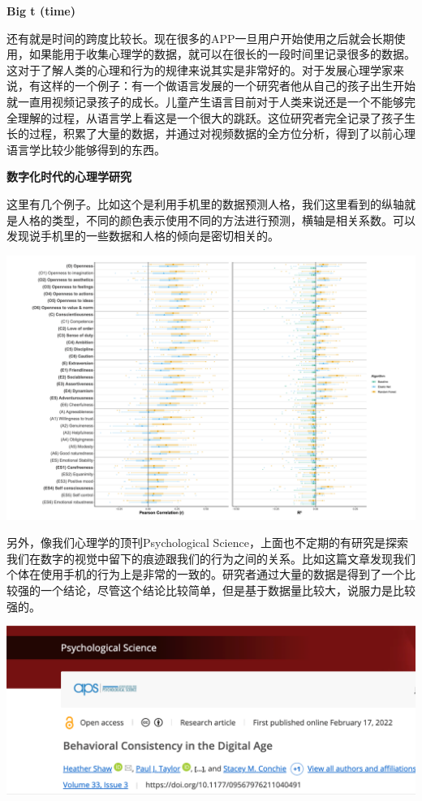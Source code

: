 \documentclass[
  oneside]{book}
\begin{document}
\textbf{Big t (time)}

还有就是时间的跨度比较长。现在很多的APP一旦用户开始使用之后就会长期使用，如果能用于收集心理学的数据，就可以在很长的一段时间里记录很多的数据。这对于了解人类的心理和行为的规律来说其实是非常好的。对于发展心理学家来说，有这样的一个例子：有一个做语言发展的一个研究者他从自己的孩子出生开始就一直用视频记录孩子的成长。儿童产生语言目前对于人类来说还是一个不能够完全理解的过程，从语言学上看这是一个很大的跳跃。这位研究者完全记录了孩子生长的过程，积累了大量的数据，并通过对视频数据的全方位分析，得到了以前心理语言学比较少能够得到的东西。

\textbf{数字化时代的心理学研究}

这里有几个例子。比如这个是利用手机里的数据预测人格，我们这里看到的纵轴就是人格的类型，不同的颜色表示使用不同的方法进行预测，横轴是相关系数。可以发现说手机里的一些数据和人格的倾向是密切相关的。

\includegraphics{1001-lesson1/image-20230302195218412.png}

另外，像我们心理学的顶刊Psychological Science，上面也不定期的有研究是探索我们在数字的视觉中留下的痕迹跟我们的行为之间的关系。比如这篇文章发现我们个体在使用手机的行为上是非常的一致的。研究者通过大量的数据是得到了一个比较强的一个结论，尽管这个结论比较简单，但是基于数据量比较大，说服力是比较强的。

\includegraphics{1001-lesson1/image-20230302195243394.png}
\end{document}
